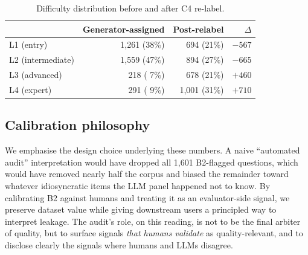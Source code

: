 \begin{table}[h]
  \centering
  \caption{Difficulty distribution before and after C4 re-label.}
  \label{tab:difficulty-shift}
  \footnotesize
  \begin{tabular}{lrrr}
    \toprule
    & Generator-assigned & Post-relabel & $\Delta$ \\
    \midrule
    L1 (entry)        & 1{,}261 (38\%) & 694   (21\%) & $-567$ \\
    L2 (intermediate) & 1{,}559 (47\%) & 894   (27\%) & $-665$ \\
    L3 (advanced)     &   218 ( 7\%) & 678   (21\%) & $+460$ \\
    L4 (expert)       &   291 ( 9\%) & 1{,}001 (31\%) & $+710$ \\
    \bottomrule
  \end{tabular}
\end{table}

\subsection{Calibration philosophy}
\label{app:calibration-philosophy}
We emphasise the design choice underlying these numbers. A naive
``automated audit'' interpretation would have dropped all 1{,}601
B2-flagged questions, which would have removed nearly half the corpus
and biased the remainder toward whatever idiosyncratic items the LLM
panel happened not to know. By calibrating B2 against humans and
treating it as an evaluator-side signal, we preserve dataset value while
giving downstream users a principled way to interpret leakage. The
audit's role, on this reading, is not to be the final arbiter of
quality, but to surface signals \emph{that humans validate} as
quality-relevant, and to disclose clearly the signals where humans and
LLMs disagree.
